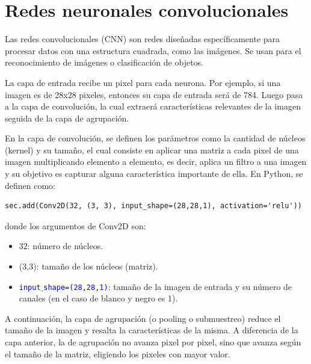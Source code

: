 \documentclass[a4paper, 12pt]{book}
\begin{document}
\section{Redes neuronales convolucionales}
Las redes convolucionales (CNN) son redes diseñadas específicamente para procesar datos con una estructura cuadrada, como las imágenes. Se usan para el reconocimiento de imágenes o clasificación de objetos.

La capa de entrada recibe un pixel para cada neurona. Por ejemplo, si una imagen es de 28x28 pixeles, entonces su capa de entrada será de 784. Luego pasa a la capa de convolución, la cual extraerá características relevantes de la imagen seguida de la capa de agrupación.


En la capa de convolución, se definen los parámetros como la cantidad de núcleos (kernel) y su tamaño, el cual consiste en aplicar una matriz a cada pixel de una imagen multiplicando elemento a elemento, es decir, aplica un filtro a una imagen y su objetivo es capturar alguna característica importante de ella.
En Python, se definen como:
\begin{verbatim}
sec.add(Conv2D(32, (3, 3), input_shape=(28,28,1), activation='relu'))
\end{verbatim}
donde los argumentos de Conv2D son:
\begin{itemize}
	\item 32: número de núcleos.
	\item (3,3): tamaño de los núcleos (matriz).
	\item \texttt{\textcolor{blue}{input$\_$shape=(28,28,1)}}: tamaño de la imagen de entrada y su número de canales (en el caso de blanco y negro es 1).
\end{itemize}
A continuación, la capa de agrupación (o pooling o submuestreo) reduce el tamaño de la imagen y resalta la características de la misma. A diferencia de la capa anterior, la de agrupación no avanza pixel por pixel, sino que avanza según el tamaño de la matriz, eligiendo los pixeles con mayor valor.
\end{document}
